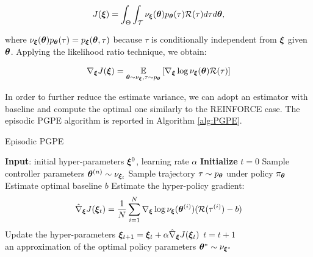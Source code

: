 \begin{align}
J(\boldsymbol{\xi}) = \int_{\Theta}\int_{\mathcal{T}}\nu_{\boldsymbol{\xi}}(\boldsymbol{\theta})p_{\boldsymbol{\theta}}(\tau)\mathcal{R}(\tau)d\tau d\boldsymbol{\theta}, 
\end{align}

where $\nu_{\boldsymbol{\xi}}(\boldsymbol{\theta})p_{\boldsymbol{\theta}}(\tau)=p_{\boldsymbol{\xi}}(\boldsymbol{\theta},\tau)$ because $\tau$ is conditionally independent from $\boldsymbol{\xi}$ given $\boldsymbol{\theta}$. Applying the likelihood ratio technique, we obtain:

\begin{align}
\nabla_{\boldsymbol{\xi}}J(\boldsymbol{\xi}) = \underset{\boldsymbol{\theta}\sim\nu_{\boldsymbol{\xi}}, \tau\sim p_{\boldsymbol{\theta}}}{\mathbb{E}}\left[{\nabla_{\boldsymbol{\xi}}\log\nu_{\boldsymbol{\xi}}(\boldsymbol{\theta})\mathcal{R}(\tau)}\right] 
\end{align}

In order to further reduce the estimate variance, we can adopt an estimator with baseline and compute the optimal one similarly to the REINFORCE case. The episodic \gls{PGPE} algorithm is reported in Algorithm \ref{alg:PGPE}.

\begin{algorithm}[t]
	\caption{Episodic \gls{PGPE}}
	\label{alg:PGPE}
	\begin{algorithmic}[1]
	\State \textbf{Input}: initial hyper-parameters $\boldsymbol{\xi}^{0}$, learning rate $\alpha$
	\State \textbf{Initialize} $t=0$
			\State Sample controller parameters $\boldsymbol{\theta}^{(n)} \sim\nu_{\boldsymbol{\xi}_t}$
			\State Sample trajectory $\tau\sim p_{\boldsymbol{\theta}}$ under policy $\pi_{\boldsymbol{\theta}}$
		\EndFor 
		\State Estimate optimal baseline $b$
		\State Estimate the hyper-policy gradient:
		\begin{align*}
		\hat{\nabla}_{\boldsymbol{\xi}}J(\boldsymbol{\xi}_t) = \frac{1}{N}\sum_{i=1}^{N}\nabla_{\boldsymbol{\xi}}\log \nu_{\boldsymbol{\xi}}(\boldsymbol{\theta}^{(i)})(\mathcal{R}(\tau^{(i)}) - b)
		\end{align*}
		\State Update the hyper-parameters $\boldsymbol{\xi}_{t+1} = \boldsymbol{\xi}_{t}+\alpha\hat{\nabla}_{\boldsymbol{\xi}}J(\boldsymbol{\xi}_t)$
		\State $t = t + 1$
	\EndWhile \\
	\Return an approximation of the optimal policy parameters $\boldsymbol{\theta}^* \sim \nu_{\boldsymbol{\xi}^*}$
	\end{algorithmic}
\end{algorithm}

  

